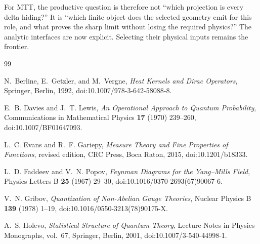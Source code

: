 \documentclass[11pt]{article}
\begin{document}
For MTT, the productive question is therefore not ``which projection is every
delta hiding?'' It is ``which finite object does the selected geometry emit
for this role, and what proves the sharp limit without losing the required
physics?'' The analytic interfaces are now explicit. Selecting their physical
inputs remains the frontier.

\begin{thebibliography}{99}

N.~Berline, E.~Getzler, and M.~Vergne,
\emph{Heat Kernels and Dirac Operators},
Springer, Berlin, 1992,
doi:10.1007/978-3-642-58088-8.

E.~B. Davies and J.~T. Lewis,
\emph{An Operational Approach to Quantum Probability},
Communications in Mathematical Physics \textbf{17} (1970) 239--260,
doi:10.1007/BF01647093.

L.~C. Evans and R.~F. Gariepy,
\emph{Measure Theory and Fine Properties of Functions},
revised edition, CRC Press, Boca Raton, 2015,
doi:10.1201/b18333.

L.~D. Faddeev and V.~N. Popov,
\emph{Feynman Diagrams for the Yang--Mills Field},
Physics Letters B \textbf{25} (1967) 29--30,
doi:10.1016/0370-2693(67)90067-6.

V.~N. Gribov,
\emph{Quantization of Non-Abelian Gauge Theories},
Nuclear Physics B \textbf{139} (1978) 1--19,
doi:10.1016/0550-3213(78)90175-X.

A.~S. Holevo,
\emph{Statistical Structure of Quantum Theory},
Lecture Notes in Physics Monographs, vol.~67,
Springer, Berlin, 2001,
doi:10.1007/3-540-44998-1.

\end{thebibliography}
\end{document}
